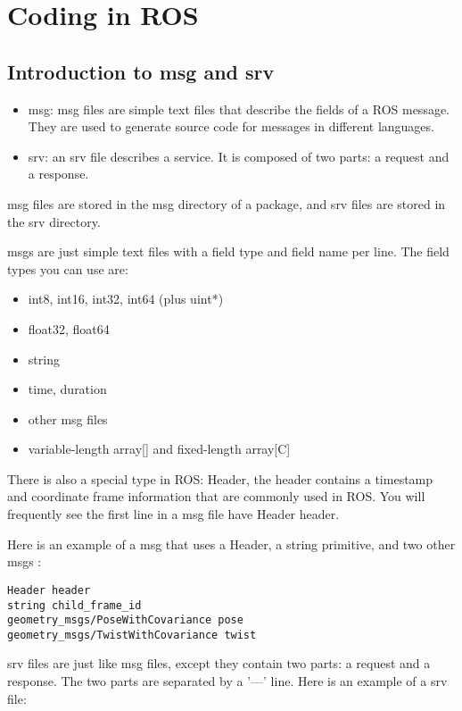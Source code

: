 \chapter{Coding in ROS}

\section{Introduction to msg and srv}

\begin{itemize}
	\item  msg: msg files are simple text files that describe the fields of a ROS message. They are used to generate source code for messages in different languages.
	
	\item srv: an srv file describes a service. It is composed of two parts: a request and a response.
\end{itemize}

msg files are stored in the msg directory of a package, and srv files are stored in the srv directory.

msgs are just simple text files with a field type and field name per line. The field types you can use are:

\begin{itemize}
	\item int8, int16, int32, int64 (plus uint*)
	\item float32, float64
	\item string
	\item time, duration
	\item other msg files
	\item variable-length array[] and fixed-length array[C]
\end{itemize}

There is also a special type in ROS: Header, the header contains a timestamp and coordinate frame information that are commonly used in ROS. You will frequently see the first line in a msg file have Header header.

Here is an example of a msg that uses a Header, a string primitive, and two other msgs :
\begin{lstlisting}[breaklines=true languages=bash]
Header header
string child_frame_id
geometry_msgs/PoseWithCovariance pose
geometry_msgs/TwistWithCovariance twist
\end{lstlisting}

srv files are just like msg files, except they contain two parts: a request and a response. The two parts are separated by a '---' line. Here is an example of a srv file:

